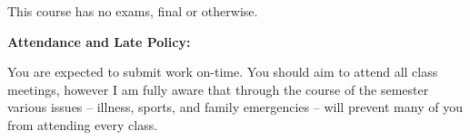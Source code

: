 \documentclass[12pt]{article}
\begin{document}
This course has no exams, final or otherwise.

\vspace{0.4cm}

\textbf{Attendance and Late Policy:} \vspace{6pt}

You are expected to submit work on-time.
You should aim to attend all class meetings, however I am fully aware that through
the course of the semester various issues -- illness, sports, and family emergencies --
will prevent many of you from attending every class.






\end{document}
